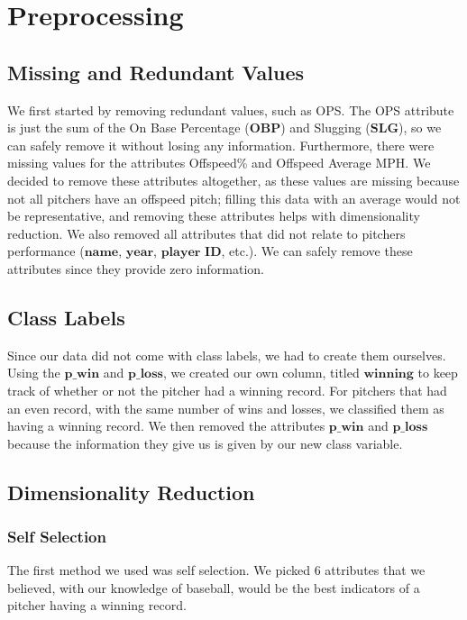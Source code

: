 \documentclass[12pt]{article}
\begin{document}
\section{Preprocessing}
\subsection{Missing and Redundant Values}
We first started by removing redundant values, such as OPS. The OPS attribute is just the sum of the On Base Percentage ($\textbf{OBP}$) and Slugging ($\textbf{SLG}$), so we can safely remove it without losing any information. Furthermore, there were missing values for the attributes Offspeed\% and Offspeed Average MPH. We decided to remove these attributes altogether, as these values are missing because not all pitchers have an offspeed pitch; filling this data with an average would not be representative, and removing these attributes helps with dimensionality reduction. We also removed all attributes that did not relate to pitcher\textquotesingle s performance ($\textbf{name}$, $\textbf{year}$, $\textbf{player}$ $\textbf{ID}$, etc.). We can safely remove these attributes since they provide zero information. 
\newpage{}
\subsection{Class Labels}
Since our data did not come with class labels, we had to create them ourselves. Using the $\textbf{p\_win}$ and $\textbf{p\_loss}$, we created our own column, titled $\textbf{winning}$ to keep track of whether or not the pitcher had a winning record. For pitchers that had an even record, with the same number of wins and losses, we classified them as having a winning record. We then removed the attributes $\textbf{p\_win}$ and $\textbf{p\_loss}$ because the information they give us is given by our new class variable. 

\subsection{Dimensionality Reduction}

\subsubsection{Self Selection}
The first method we used was self selection. We picked 6 attributes that we believed, with our knowledge of baseball, would be the best indicators of a pitcher having a winning record. 
\end{document}
